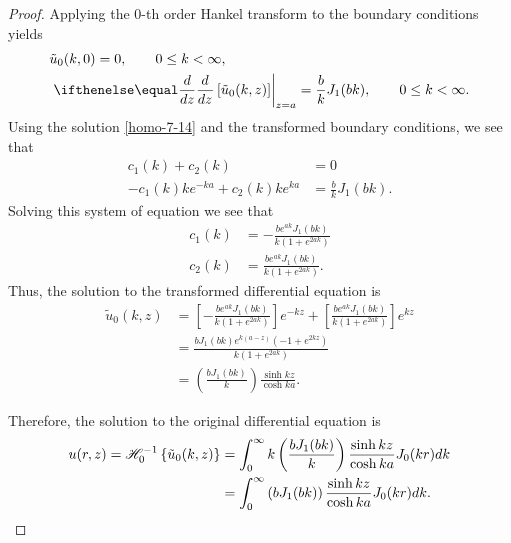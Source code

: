 \begin{proof}
  Applying the 0-th order Hankel transform to the boundary conditions yields
  \begin{align*}
    &\tilde{u}_0(k, 0) = 0, \qquad 0 \leq k < \infty, \\
    &\left.\der{z}{}\left[\tilde{u}_0(k, z)\right]\right\rvert_{z=a} = \frac{b}{k}J_1(bk), \qquad 0 \leq k < \infty.
  \end{align*}
  Using the solution \eqref{homo-7-14} and the transformed boundary conditions,
  we see that
  \begin{align*}
    c_1(k) + c_2(k) &= 0 \\
    -c_1(k) k e^{-ka}+ c_2(k) k e^{ka} &= \frac{b}{k}J_1(bk).
  \end{align*}
  Solving this system of equation we see that
  \begin{align*}
    c_1(k) &= -\frac{b e^{a k }J_1(b k )}{k\left(1 + e^{2 ak }\right)}\\
    c_2(k) &= \frac{b e^{a k }J_1(b k )}{k\left(1 + e^{2 ak }\right)}.
  \end{align*}
  Thus, the solution to the transformed differential equation is
  \begin{align*}
    \tilde{u}_0(k, z) &= \left[-\frac{b e^{a k }J_1(b k )}{k\left(1 + e^{2 ak }\right)} \right]e^{-kz}+ \left[\frac{b e^{a k }J_1(b k )}{k\left(1 + e^{2 ak }\right)}\right] e^{kz}\\
    &= \frac{b J_1(bk) e^{k(a-z)}\left(- 1 + e^{2 kz }\right)}{k \left(1 + e^{2 ak }\right)}\\
    &= \left(\frac{b J_1(bk)}{k}\right)\frac{\sinh k z}{\cosh ka}.
  \end{align*}

  Therefore, the solution to the original differential equation is
  \begin{align*}
    u(r, z) = \mathscr{H}^{-1}_{ {0} }\left\{ {\tilde{u}_0(k, z)} \right\} &= \int_0^\infty k \left(\frac{b J_1(bk)}{k}\right)\frac{\sinh k z}{\cosh ka} J_0(k r) dk \\
    &= \int_0^\infty \left(b J_1(bk)\right)\frac{\sinh k z}{\cosh ka} J_0(k r) dk .
  \end{align*}
\end{proof}
\newpage
